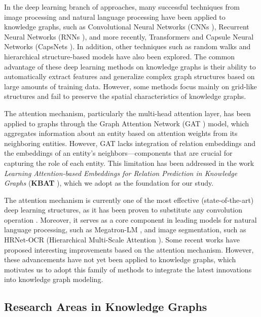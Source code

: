 In the deep learning branch of approaches, many successful techniques from image processing and natural language processing have been applied to knowledge graphs, such as Convolutional Neural Networks (CNNs \cite{lecun1999object}), Recurrent Neural Networks (RNNs \cite{hopfield2007hopfield}), and more recently, Transformers \cite{yang2019xlnet} and Capsule Neural Networks (CapsNets \cite{sabour2017dynamic}). In addition, other techniques such as random walks and hierarchical structure-based models have also been explored. The common advantage of these deep learning methods on knowledge graphs is their ability to automatically extract features and generalize complex graph structures based on large amounts of training data. However, some methods focus mainly on grid-like structures and fail to preserve the spatial characteristics of knowledge graphs.

The attention mechanism, particularly the multi-head attention layer, has been applied to graphs through the Graph Attention Network (GAT \cite{velivckovic2017graph}) model, which aggregates information about an entity based on attention weights from its neighboring entities. However, GAT lacks integration of relation embeddings and the embeddings of an entity's neighbors—components that are crucial for capturing the role of each entity. This limitation has been addressed in the work \textit{Learning Attention-based Embeddings for Relation Prediction in Knowledge Graphs} (\textbf{KBAT} \cite{nathani2019learning}), which we adopt as the foundation for our study.


The attention mechanism is currently one of the most effective (state-of-the-art) deep learning structures, as it has been proven to substitute any convolution operation \cite{cordonnier2019relationship}. Moreover, it serves as a core component in leading models for natural language processing, such as Megatron-LM \cite{shoeybi2019megatron}, and image segmentation, such as HRNet-OCR (Hierarchical Multi-Scale Attention \cite{tao2020hierarchical}). Some recent works \cite{cordonnier2020multi} have proposed interesting improvements based on the attention mechanism. However, these advancements have not yet been applied to knowledge graphs, which motivates us to adopt this family of methods to integrate the latest innovations into knowledge graph modeling.

\subsection{Research Areas in Knowledge Graphs}


